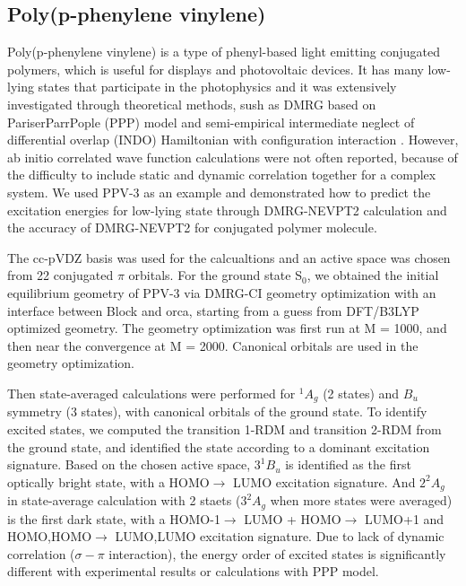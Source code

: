 \subsection{Poly(p-phenylene vinylene)}

Poly(p-phenylene vinylene) is a type of phenyl-based light emitting conjugated polymers, which is useful for displays and photovoltaic devices. It has many low-lying states that participate in the photophysics and it was extensively investigated through theoretical methods, sush as DMRG based on Pariser\textendash Parr\textendash Pople (PPP) model \cite{shukla_correlated_2002}\cite{bursill_symmetry-adapted_2009} and semi-empirical intermediate neglect of differential overlap (INDO) Hamiltonian with configuration interaction \cite{beljonne_theoretical_1995}. 
However, ab initio correlated wave function calculations were not often reported, because of the difficulty to include static and dynamic correlation together for a complex system.
We used PPV-3 as an example and demonstrated how to predict the excitation energies for low-lying state through DMRG-NEVPT2 calculation and the accuracy of DMRG-NEVPT2 for conjugated polymer molecule.

The cc-pVDZ basis was used for the calcualtions and an active space was chosen from 22 conjugated $\pi$ orbitals. For the ground state S$_{0}$, we obtained the initial equilibrium geometry of PPV-3 via DMRG-CI geometry optimization with an interface between Block and orca\cite{neese_orca_2012}, starting from a guess from DFT/B3LYP optimized geometry. The geometry optimization was first run at M = 1000, and then near the convergence at M = 2000. Canonical orbitals are used in the geometry optimization.

Then state-averaged calculations were performed for $^1A_g$ (2 states) and $B_u$ symmetry (3 states), with canonical orbitals of the ground state. 
To identify excited states, we computed the transition 1-RDM and transition 2-RDM from the ground state, and identified the state according to a dominant excitation signature.
Based on the chosen active space, $3^1B_u$ is identified as the first optically bright state, with a HOMO$\rightarrow$ LUMO excitation signature. And $2^2A_g$ in state-average calculation with 2 staets ($3^2A_g$ when more states were averaged) is the first dark state, with a HOMO-1$\rightarrow$ LUMO + HOMO$\rightarrow$ LUMO+1 and HOMO,HOMO$\rightarrow$ LUMO,LUMO excitation signature.
Due to lack of dynamic correlation ($\sigma-\pi$ interaction), the energy order of excited states is significantly different with experimental results or calculations with PPP model.

